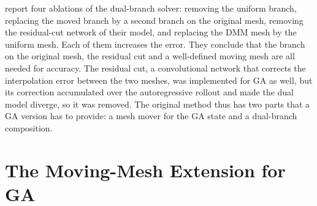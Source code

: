 \citet{Hu2024} report four ablations of the dual-branch solver: removing
the uniform branch, replacing the moved branch by a second branch on the
original mesh, removing the residual-cut network of their model, and
replacing the DMM mesh by the uniform mesh. Each of them increases the
error. They conclude that the branch on the original mesh, the residual
cut and a well-defined moving mesh are all needed for accuracy. The
residual cut, a convolutional network that corrects the interpolation
error between the two meshes, was implemented for GA as well, but its
correction accumulated over the autoregressive rollout and made the dual
model diverge, so it was removed. The original method thus has two parts that a GA version has to
provide: a mesh mover for the GA state and a dual-branch composition.


\section{The Moving-Mesh Extension for GA}
\label{app:mm-pde:extension}

